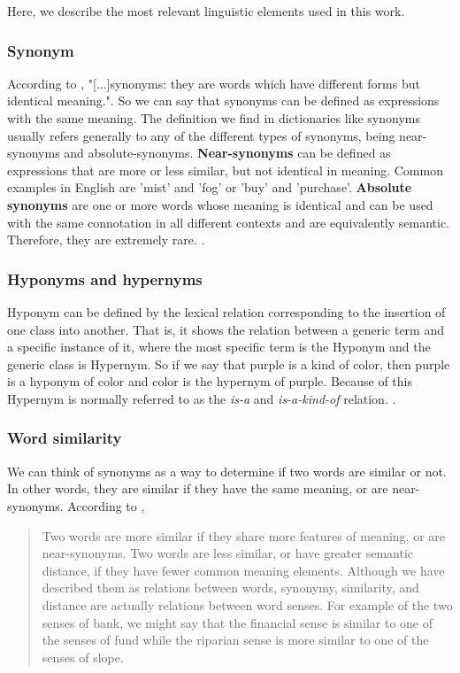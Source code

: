 Here, we describe the most relevant linguistic elements used in this work.

\subsubsection{Synonym}

According to , "[...]synonyms: they are words which have different forms but identical meaning.". So we can say that synonyms can be defined as expressions with the same meaning. The definition we find in dictionaries like synonyms usually refers generally to any of the different types of synonyms, being near-synonyms and absolute-synonyms. \textbf{Near-synonyms} can be defined as expressions that are more or less similar, but not identical in meaning. Common examples in English are ’mist’ and ’fog’ or ’buy’ and ’purchase’. \textbf{Absolute synonyms} are one or more words whose meaning is identical and can be used with the same connotation in all different contexts and are equivalently semantic.  Therefore, they are extremely rare. \cite{lyons1995linguistic}.

\subsubsection{Hyponyms and hypernyms}

Hyponym can be defined by the lexical relation corresponding to the insertion of one class into another. That is, it shows the relation between a generic term and a specific instance of it, where the most specific term is the Hyponym and the generic class is Hypernym. So if we say that purple is a kind of color, then purple is a hyponym of color and color is the hypernym of purple. Because of this Hypernym is normally referred to as the \textit{is-a} and \textit{is-a-kind-of} relation. \cite[p.~88]{cruse1986lexical}.

\subsubsection{Word similarity}

We can think of synonyms as a way to determine if two words are similar or not. In other words, they are similar if they have the same meaning, or are near-synonyms. According to ,

\begin{quote}
Two words are more similar if they share more features of meaning, or are near-synonyms. Two words are less similar, or have greater semantic distance, if they have fewer common meaning elements. Although we have described them as relations between words, synonymy, similarity, and distance are actually relations between word senses. For example of the two senses of bank, we might say that the financial sense is similar to one of the senses of fund while the riparian sense is more similar to one of the senses of slope.
\end{quote}


